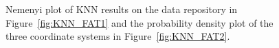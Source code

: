 \documentclass[a4paper,11pt]{article}
\begin{document}
\begin{figure}[!h]
	\centering
	\caption{Nemenyi plot of KNN results on the data repository in Figure~\ref{fig:KNN_FAT1} and the probability density plot of the three coordinate systems in Figure~\ref{fig:KNN_FAT2}. }
	\label{fig:KNN_FAT}
\end{figure}
\end{document}
